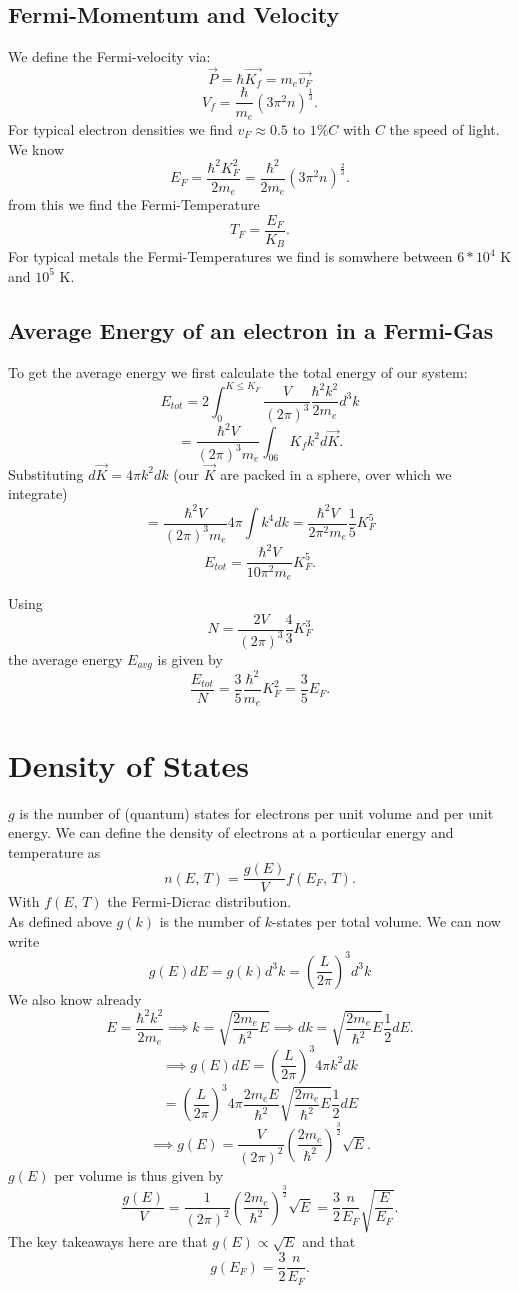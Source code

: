 \documentclass{report}
\begin{document}
\subsection{Fermi-Momentum and Velocity}
We define the Fermi-velocity via:
\[
	\vec{P} = \hbar \vec{K_f} = m_e \vec{v_F}
\]\[
V_f = \frac{\hbar}{m_e} \left( 3 \pi^2 n \right) ^{\frac{1}{3}}
.\] For typical electron densities we find $v_F \approx 0.5 \text{ to } 1\% C$ with $C$ the speed of light. 
We know \[
	E_F = \frac{\hbar^2 K_F^2}{2m_e} = \frac{\hbar^2}{2 m_e} \left( 3 \pi^2 n \right) ^{\frac{2}{3}}
.\] from this we find the Fermi-Temperature \[
T_F = \frac{E_F}{K_B}
.\] For typical metals the Fermi-Temperatures we find is somwhere between $6*10^4$ K and $10^5$ K.
\subsection{Average Energy of an electron in a Fermi-Gas}
To get the average energy we first calculate the total energy of our system: \[
	E_{tot} = 2 \int_0^{K\le K_F} \frac{V}{(2\pi)^3} \frac{\hbar^2 k^2}{2 m_e} d^3k
\] \[
= \frac{\hbar^2 V}{\left( 2 \pi \right) ^3 m_e} \int_{06}{K_f} k^2 d\vec{K}		
.\] Substituting $d\vec{K} = 4\pi k^2 dk$ (our $\vec{K}$ are packed in a sphere, over which we integrate) \[
= \frac{\hbar^2 V}{\left( 2 \pi \right) ^3 m_e} 4\pi \int k^4 dk = \frac{\hbar^2 V}{2 \pi^2 m_e} \frac{1}{5} K_F^5
\] \[
E_{tot} = \frac{\hbar^2 V}{10\pi^2 m_e}K_F^5
.\]  

Using \[
N = \frac{2V}{\left( 2\pi \right) ^3} \frac{4}{3} K_F^3
\] 
the average energy $E_{avg}$ is given by \[
	\frac{E_{tot}}{N} = \frac{3}{5} \frac{\hbar^2}{m_e}K_F^2 = \frac{3}{5}E_F
.\] 
\section{Density of States}
$g$ is the number of (quantum) states for electrons per unit volume and per unit energy. We can define the density of electrons at a porticular energy and temperature as \[
	n\left( E\text{, }T \right) = \frac{g(E)}{V} f\left( E_F\text{, }T \right) 
.\] With $f\left( E\text{, }T \right) $ the Fermi-Dicrac distribution. \\
As defined above $g(k)$ is the number of $k$-states per total volume. We can now write \[
	g(E)dE = g(k)d^3k = \left( \frac{L}{2\pi} \right) ^3 d^3k
\] We also know already \[
E = \frac{\hbar^2 k^2}{2 m_e} \implies k = \sqrt{\frac{2m_e}{\hbar^2}E} \implies dk = \sqrt{\frac{2m_e}{\hbar^2}E} \frac{1}{2} dE
.\] \[
\implies g(E) dE = \left( \frac{L}{2\pi} \right) ^3 4\pi k^2 dk
\] \[
= \left( \frac{L}{2\pi} \right) ^3 4\pi \frac{2m_e E}{\hbar^2} \sqrt{\frac{2m_e}{\hbar^2} E} \frac{1}{2} dE
\] \[
\implies g(E) = \frac{V}{\left( 2\pi \right) ^2} \left( \frac{2 m_e}{\hbar^2} \right) ^{\frac{3}{2}} \sqrt{E} 
.\] $g(E)$ per volume is thus given by \[
\frac{g(E)}{V} = \frac{1}{\left( 2\pi \right) ^2} \left( \frac{2m_e}{\hbar^2} \right) ^{\frac{3}{2}} \sqrt{E} = \frac{3}{2} \frac{n}{E_F} \sqrt{\frac{E}{E_F}}  
.\] The key takeaways here are that $g(E) \propto \sqrt{E} $ and that \[
g(E_F) = \frac{3}{2} \frac{n}{E_F}
.\]   
\end{document}
